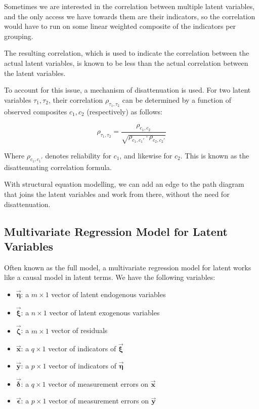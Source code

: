 \documentclass{article}
\begin{document}
\begin{multicols*}{2}
Sometimes we are interested in the correlation between multiple latent variables, and the only access we have towards them are their indicators, so the correlation would have to run on some linear weighted composite of the indicators per grouping.

The resulting correlation, which is used to indicate the correlation between the actual latent variables, is known to be less than the actual correlation between the latent variables.

To account for this issue, a mechanism of disattenuation is used. For two latent variables $\tau_1,\tau_2$, their correlation $\rho_{\tau_1,\tau_2}$ can be determined by a function of observed composites $c_1, c_2$ (respectively) as follows:

\[\rho_{\tau_1,\tau_2} = \frac{\rho_{c_1, c_2}}{\sqrt{\rho_{c_1, c_1'} \cdot \rho_{c_2, c_2'}}}\]

Where $\rho_{c_1, c_1'}$ denotes reliability for $c_1$, and likewise for $c_2$. This is known as the disattenuating correlation formula.

With structural equation modelling, we can add an edge to the path diagram that joins the latent variables and work from there, without the need for disattenuation.

\subsection{Multivariate Regression Model for Latent Variables}

Often known as the full model, a multivariate regression model for latent works like a causal model in latent terms. We have the following variables: 

\begin{itemize}
    \item $\mathbf{\vec{\eta}}$: a $m \times 1$ vector of latent endogenous variables
    \item $\mathbf{\vec{\xi}}$: a $n \times 1$ vector of latent exogenous variables
    \item $\mathbf{\vec{\zeta}}$: a $m \times 1$ vector of residuals
    \item $\mathbf{\vec{x}}$: a $q \times 1$ vector of indicators of $\mathbf{\vec{\xi}}$
    \item $\mathbf{\vec{y}}$: a $p \times 1$ vector of indicators of $\mathbf{\vec{\eta}}$
    \item $\mathbf{\vec{\delta}}$: a $q \times 1$ vector of measurement errors on $\mathbf{\vec{x}}$
    \item $\mathbf{\vec{\epsilon}}$: a $p \times 1$ vector of measurement errors on $\mathbf{\vec{y}}$
\end{itemize}


\end{multicols*}
\end{document}
